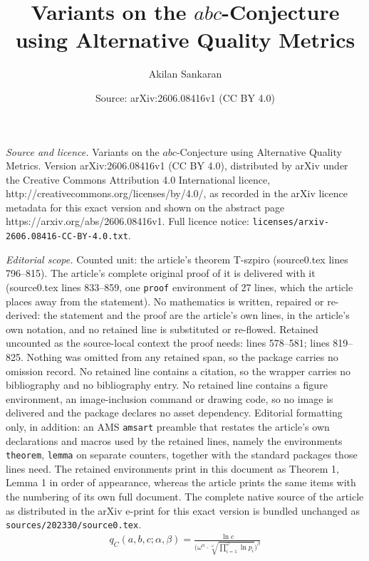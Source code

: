 \documentclass[10pt,a4paper]{amsart}
\title{Variants on the $abc$-Conjecture using Alternative Quality Metrics}
\author{Akilan Sankaran}
\date{Source: arXiv:2606.08416v1 (CC BY 4.0)}
\begin{document}
\maketitle

\noindent\emph{Source and licence.} Variants on the $abc$-Conjecture using Alternative Quality Metrics. Version arXiv:2606.08416v1 (CC BY 4.0), distributed by arXiv under the Creative Commons Attribution 4.0 International licence, http://creativecommons.org/licenses/by/4.0/, as recorded in the arXiv licence metadata for this exact version and shown on the abstract page https://arxiv.org/abs/2606.08416v1. Full licence notice: \texttt{licenses/arxiv-2606.08416-CC-BY-4.0.txt}.\par\smallskip

\noindent\textit{Editorial scope.} Counted unit: the article's theorem T-szpiro (source0.tex lines 796--815). The article's complete original proof of it is delivered with it (source0.tex lines 833--859, one \texttt{proof} environment of 27 lines, which the article places away from the statement). No mathematics is written, repaired or re-derived: the statement and the proof are the article's own lines, in the article's own notation, and no retained line is substituted or re-flowed.  Retained uncounted as the source-local context the proof needs: lines 578--581; lines 819--825.  Nothing was omitted from any retained span, so the package carries no omission record.  No retained line contains a citation, so the wrapper carries no bibliography and no bibliography entry.  No retained line contains a figure environment, an image-inclusion command or drawing code, so no image is delivered and the package declares no asset dependency.  Editorial formatting only, in addition: an AMS \texttt{amsart} preamble that restates the article's own declarations and macros used by the retained lines, namely the environments \texttt{theorem}, \texttt{lemma} on separate counters, together with the standard packages those lines need.  The retained environments print in this document as Theorem 1, Lemma 1 in order of appearance, whereas the article prints the same items with the numbering of its own full document.  The complete native source of the article as distributed in the arXiv e-print for this exact version is bundled unchanged as \texttt{sources/202330/source0.tex}.
\begin{align}
\label{eq_primefact}
    q_C(a,b,c;\alpha,\beta) = \frac{\ln c}{\bigl(\omega^\alpha\cdot\sqrt[\omega]{\prod_{i=1}^\omega \ln p_i}\bigr)^\beta}
\end{align}
\end{document}
